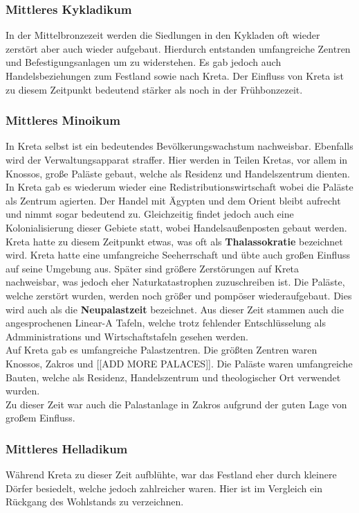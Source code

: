 \documentclass{article}
\begin{document}
	\subsubsection{Mittleres Kykladikum}
	In der Mittelbronzezeit werden die Siedlungen in den Kykladen oft wieder zerstört aber auch wieder aufgebaut. Hierdurch entstanden umfangreiche Zentren und Befestigungsanlagen um zu widerstehen. Es gab jedoch auch Handelsbeziehungen zum Festland sowie nach Kreta. Der Einfluss von Kreta ist zu diesem Zeitpunkt bedeutend stärker als noch in der Frühbonzezeit. \\
	\subsubsection{Mittleres Minoikum}
	In Kreta selbst ist ein bedeutendes Bevölkerungswachstum nachweisbar. Ebenfalls wird der Verwaltungsapparat straffer. Hier werden in Teilen Kretas, vor allem in Knossos, große Paläste gebaut, welche als Residenz und Handelszentrum dienten. \\
	In Kreta gab es wiederum wieder eine Redistributionswirtschaft wobei die Paläste als Zentrum agierten. Der Handel mit Ägypten und dem Orient bleibt aufrecht und nimmt sogar bedeutend zu. Gleichzeitig findet jedoch auch eine Kolonialisierung dieser Gebiete statt, wobei Handelsaußenposten gebaut werden. Kreta hatte zu diesem Zeitpunkt etwas, was oft als \textbf{Thalassokratie} bezeichnet wird. Kreta hatte eine umfangreiche Seeherrschaft und übte auch großen Einfluss auf seine Umgebung aus. Später sind größere Zerstörungen auf Kreta nachweisbar, was jedoch eher Naturkatastrophen zuzuschreiben ist. Die Paläste, welche zerstört wurden, werden noch größer und pompöser wiederaufgebaut. Dies wird auch als die \textbf{Neupalastzeit} bezeichnet. Aus dieser Zeit stammen auch die angesprochenen Linear-A Tafeln, welche trotz fehlender Entschlüsselung als Admministrations und Wirtschaftstafeln gesehen werden. \\
	Auf Kreta gab es umfangreiche Palastzentren. Die größten Zentren waren Knossos, Zakros und [[ADD MORE PALACES]]. Die Paläste waren umfangreiche Bauten, welche als Residenz, Handelszentrum und theologischer Ort verwendet wurden. \\
	Zu dieser Zeit war auch die Palastanlage in Zakros aufgrund der guten Lage von großem Einfluss. \\
	\subsubsection{Mittleres Helladikum}
	Während Kreta zu dieser Zeit aufblühte, war das Festland eher durch kleinere Dörfer besiedelt, welche jedoch zahlreicher waren. Hier ist im Vergleich ein Rückgang des Wohlstands zu verzeichnen. \\
\end{document}
